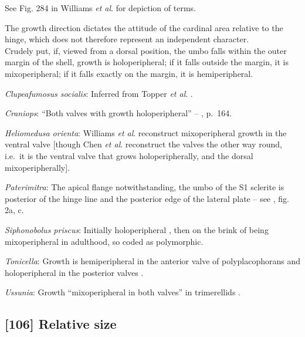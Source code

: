 \documentclass[openany]{book}
\begin{document}
See Fig. 284 in Williams \emph{et al}.
\citeyearpar{Williams1997Introduction} for depiction of terms.

The growth direction dictates the attitude of the cardinal area relative
to the hinge, which does not therefore represent an independent
character.\\
Crudely put, if, viewed from a dorsal position, the umbo falls within
the outer margin of the shell, growth is holoperipheral; if it falls
outside the margin, it is mixoperipheral; if it falls exactly on the
margin, it is hemiperipheral.

\hypertarget{Clupeafumosus_socialis-coding-105}{}
\emph{Clupeafumosus socialis}: Inferred from Topper \emph{et al}.
\citeyearpar{Topper2013Reappraisalof}.

\hypertarget{Craniops-coding-105}{}
\emph{Craniops}: ``Both valves with growth holoperipheral'' --
\citet{Williams2000LinguliformeaCraniiformea}, p.~164.

\hypertarget{Heliomedusa_orienta-coding-105}{}
\emph{Heliomedusa orienta}: Williams \emph{et al}.
\citeyearpar[2007]{Williams2000LinguliformeaCraniiformea} reconstruct
mixoperipheral growth in the ventral valve {[}though Chen \emph{et al}.
\citeyearpar{Chen2007Reinterpretationof} reconstruct the valves the
other way round, i.e.~it is the ventral valve that grows
holoperipherally, and the dorsal mixoperipherally{]}.

\hypertarget{Paterimitra-coding-105}{}
\emph{Paterimitra}: The apical flange notwithstanding, the umbo of the
S1 sclerite is posterior of the hinge line and the posterior edge of the
lateral plate -- see \citet{Larsson2014iPaterimitra}, fig. 2a, c.

\hypertarget{Siphonobolus_priscus-coding-105}{}
\emph{Siphonobolus priscus}: Initially holoperipheral
\citep[p.~159]{Popov2009Earlyontogeny}, then on the brink of being
mixoperipheral in adulthood, so coded as polymorphic.

\hypertarget{Tonicella-coding-105}{}
\emph{Tonicella}: Growth is hemiperipheral in the anterior valve of
polyplacophorans and holoperipheral in the posterior valves
\citep{Schwabe2010, Connors2012}.

\hypertarget{Ussunia-coding-105}{}
\emph{Ussunia}: Growth ``mixoperipheral in both valves'' in trimerellids
\citep{Williams2000LinguliformeaCraniiformea, Popov1997}.

\subsection*{{[}106{]} Relative size}\label{relative-size}
\end{document}
